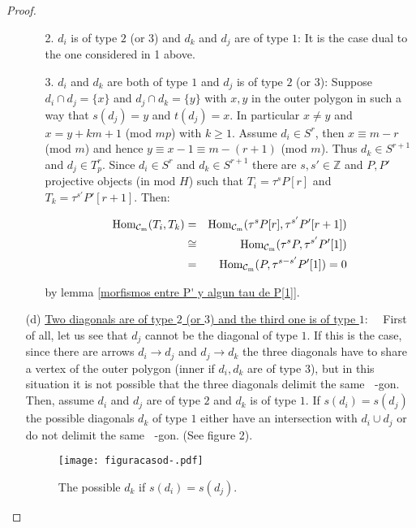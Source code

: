\documentclass{amsart}
\theoremstyle{plain}
\theoremstyle{definition}
\begin{document}
\begin{proof}
\begin{itemize}
\begin{itemize}
  \item [2.] $d_i$ is of type $2$ (or $3$) and  $d_k$ and  $d_j$ are of type $1$: It is the case dual to the one considered in 1 above. \\

  \item [3.] $d_i$ and $d_k$ are both of type $1$ and $d_j$ is of  type $2$ (or $3$): Suppose $d_i\cap d_j=\{x\}$ and $d_j\cap d_k=\{y\}$ with $x,y$ in the outer  polygon  in such a way that  $s(d_j)=y$ and $t(d_j)=x$. In particular  $x\neq y$ and $x=y+km+1$ (mod $mp$) with $k\geq 1$.  Assume $d_i\in S^r$, then  $x\equiv m-r$ (mod $m$) and hence  $y\equiv x-1\equiv m-(r+1)$ (mod $m$). Thus  $d_k\in S^{r+1}$ and $d_j\in T^{r}_p$. Since $d_i\in S^r$ and $d_k\in S^{r+1}$  there are  $s,s'\in \mathbb{Z}$ and $P,P'$ projective objects (in  mod $H$) such that  $T_i=\tau^s P[r]$  and  $T_k=\tau^{s'}P'[r+1]$. Then:

      \begin{eqnarray*}
      {\mathop{\rm Hom_{\mathcal{C}_m}}\nolimits}(T_i,T_k) & = & {\mathop{\rm Hom_{\mathcal{C}_m}}\nolimits}(\tau^s P[r],\tau^{s'}P'[r+1])\\
      & \cong  & {\mathop{\rm Hom_{\mathcal{C}_m}}\nolimits}(\tau^s P,\tau^{s'}P'[1])\\
      & = & {\mathop{\rm Hom_{\mathcal{C}_m}}\nolimits}(P, \tau^{s-s'}P'[1])=0
      \end{eqnarray*}

by lemma \ref{morfismos entre P' y algun tau de P[1]}.\\

\end{itemize}

  \item [(d)] \underline{Two diagonals are of type $2$ (or $3$) and the third one is of  type $1$}: \  \
       First of all, let us  see that $d_j$ cannot be the diagonal of type $1$. If this is the case, since there are arrows $d_i\rightarrow d_j$  and $d_j\rightarrow d_k$ the three  diagonals have to share a vertex of the outer polygon (inner if $d_i,d_k$ are of type $3$), but in this situation it is not possible that the three diagonals  delimit the same ${\mathop{(m+2)}\nolimits}$-gon.   Then, assume $d_i$ and $d_j$ are of type $2$ and $d_k$ is of type $1$. If   $s(d_i)=s(d_j)$ the possible  diagonals $d_k$ of type $1$ either have an intersection with  $d_i\cup d_j$ or do not delimit the same  ${\mathop{(m+2)}\nolimits}$-gon. (See figure 2).

       \begin{figure}[H]\label{caso d}
       \begin{center}
       \hspace*{2cm}\texttt{[image: figuracasod-.pdf]}
       \vspace*{-1cm}
       \caption{The possible $d_k$ if  $s(d_i)=s(d_j)$. }
       \end{center}
       \end{figure}


\end{itemize}
\end{proof}
\end{document}
